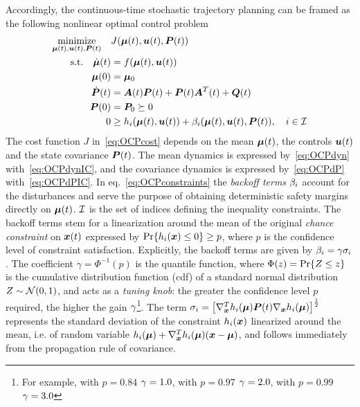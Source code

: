 Accordingly, the continuous-time stochastic trajectory planning can be framed as the following nonlinear optimal control problem
\begin{subequations}\label{eq:OCP}
\begin{align}
	\underset{\bmu(t), \bu(t), \bP(t)}{\text{minimize}} \quad & J(\bmu(t), \bu(t), \bP(t)) \label{eq:OCPcost} \\
	\text{s.t.} \quad \dbmu(t)           &= f(\bmu(t), \bu(t)) \label{eq:OCPdyn} \\
	\phantom{\text{s.t.} \quad} \bmu(0)  &= \bmu_0 \label{eq:OCPdynIC} \\
	\phantom{\text{s.t.} \quad} \dbP(t) &= \bA(t) \bP(t) + \bP(t) \bA^T(t) + \bQ(t) \label{eq:OCPdP} \\
	\phantom{\text{s.t.} \quad} \bP(0)  &= \bP_0 \succeq 0 \label{eq:OCPdPIC} \\ %
	\phantom{\text{s.t.} \qquad} 0&       \geq h_i(\bmu(t), \bu(t))
	+ \be_i(\bmu(t), \bu(t), \bP(t)),
	\quad i \in \calI \label{eq:OCPconstraints}
\end{align}
\end{subequations}
The cost function $J$ in~\eqref{eq:OCPcost} depends on the mean $\boldsymbol{\mu}(t)$, the controls $\boldsymbol{u}(t)$ and the state covariance $\boldsymbol{P}(t)$. The mean dynamics is expressed by~\eqref{eq:OCPdyn} with~\eqref{eq:OCPdynIC}, and the covariance dynamics is expressed by~\eqref{eq:OCPdP} with~\eqref{eq:OCPdPIC}. In eq.~\eqref{eq:OCPconstraints} the \emph{backoff terms} $\beta_i$ account for the disturbances and serve the purpose of obtaining deterministic safety margins directly on $\boldsymbol{\mu}(t)$. $\mathcal{I}$ is the set of indices defining the inequality constraints. The backoff terms stem for a linearization around the mean of the original \emph{chance constraint} on $\boldsymbol{x}(t)$ expressed by $\operatorname{Pr} \{h_i(\boldsymbol{x}) \leq 0\}\geq p$, where $p$ is the confidence level of constraint satisfaction. Explicitly, the backoff terms are given by
$\beta_i = \gamma \sigma_i$. The coefficient $\gamma = \Phi^{-1}(p)$ is the quantile function, where $\Phi(z)=\operatorname{Pr} \{Z\leq z\}$ is the cumulative distribution function (cdf) of a standard normal distribution $Z \sim \mathcal{N}(0,1)$, and acts as a \emph{tuning knob}: the greater the confidence level $p$ required, the higher the gain $\gamma$\footnote{For example, with $p=0.84$ $\gamma = 1.0$, with $p=0.97$ $\gamma = 2.0$, with $p=0.99$ $\gamma = 3.0$}. The term $\sigma_i = \big[\nabla^T_{\boldsymbol{x}} h_i(\boldsymbol{\mu}) \boldsymbol{P}(t) \nabla_{\boldsymbol{x}} h_i(\boldsymbol{\mu})\big]^{\frac{1}{2}}$ represents the standard deviation of the constraint $h_i(\boldsymbol{x})$ linearized around the mean, i.e. of random variable $h_i(\boldsymbol{\mu})+\nabla^T_{\boldsymbol{x}} h_i(\boldsymbol{\mu}) (\boldsymbol{x} - \boldsymbol{\mu})$, and follows immediately from the propagation rule of covariance.

